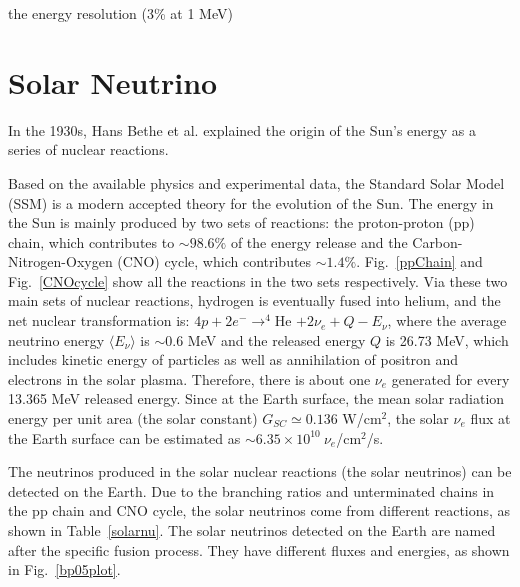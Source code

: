 the energy resolution (3\% at 1 MeV) 
\cite{giaz2018status}

\section{Solar Neutrino}
In the 1930s, Hans Bethe et al. explained the origin of the Sun's energy as a series of nuclear reactions\cite{bethe1939energy}.

Based on the available physics and experimental data, the Standard Solar Model (SSM) is a modern accepted theory for the evolution of the Sun. The energy in the Sun is mainly produced by two sets of reactions: the proton-proton (pp) chain, which contributes to $\sim 98.6\%$ of the energy release and the Carbon-Nitrogen-Oxygen (CNO) cycle, which contributes $\sim 1.4\%$. Fig.~\ref{ppChain} and Fig.~\ref{CNOcycle} show all the reactions in the two sets respectively. Via these two main sets of nuclear reactions, hydrogen is eventually fused into helium, and the net nuclear transformation is: $4p+2e^-\to^{4}$He $+2\nu_e+Q-E_\nu$, where the average neutrino energy $\langle E_\nu \rangle$ is $\sim 0.6$ MeV and the released energy $Q$ is 26.73 MeV, which includes kinetic energy of particles as well as annihilation of positron and electrons in the solar plasma\cite{antonio2018state}. Therefore, there is about one $\nu_e$ generated for every 13.365 MeV released energy. Since at the Earth surface, the mean solar radiation energy per unit area (the solar constant) $G_{SC}\simeq 0.136$ W/cm$^2$, the solar $\nu_e$ flux at the Earth surface can be estimated as $\sim 6.35\times 10^{10}~\nu_e$/cm$^2$/s\cite{suekane2015neutrino}. 

The neutrinos produced in the solar nuclear reactions (the solar neutrinos) can be detected on the Earth\cite{giunti2007fundamentals}. Due to the branching ratios and unterminated chains in the pp chain and CNO cycle, the solar neutrinos come from different reactions, as shown in Table~\ref{solarnu}. The solar neutrinos detected on the Earth are named after the specific fusion process\cite{haxton2013solar}. They have different fluxes and energies, as shown in Fig.~\ref{bp05plot}\cite{bahcall2005new}.

